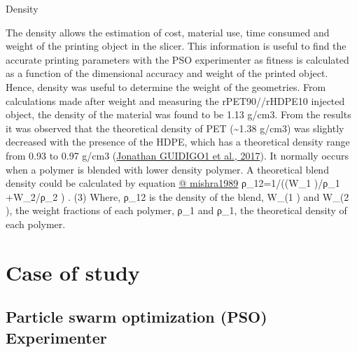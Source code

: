 \documentclass[
  12pt,
  number,
  review]{elsarticle}
\begin{document}
Density

The density allows the estimation of cost, material use, time consumed
and weight of the printing object in the slicer. This information is
useful to find the accurate printing parameters with the PSO
experimenter as fitness is calculated as a function of the dimensional
accuracy and weight of the printed object. Hence, density was useful to
determine the weight of the geometries. From calculations made after
weight and measuring the rPET90//rHDPE10 injected object, the density of
the material was found to be 1.13 g/cm3. From the results it was
observed that the theoretical density of PET (\textasciitilde1.38 g/cm3)
was slightly decreased with the presence of the HDPE, which has a
theoretical density range from 0.93 to 0.97 g/cm3
(\protect\hyperlink{ref-jonathanguidigo12017}{Jonathan GUIDIGO1 et al.,
2017}). It normally occurs when a polymer is blended with lower density
polymer. A theoretical blend density could be calculated by equation
\href{3}{@ mishra1989} ρ\_12=1/((W\_1 )/ρ\_1 +W\_2/ρ\_2 ) . (3) Where,
ρ\_12 is the density of the blend, W\_(1 ) and W\_(2 ), the weight
fractions of each polymer, ρ\_1 and ρ\_1, the theoretical density of
each polymer.

\hypertarget{case-of-study-1}{%
\section{Case of study}\label{case-of-study-1}}

\hypertarget{particle-swarm-optimization-pso-experimenter}{%
\subsection{Particle swarm optimization (PSO)
Experimenter}\label{particle-swarm-optimization-pso-experimenter}}
\end{document}
